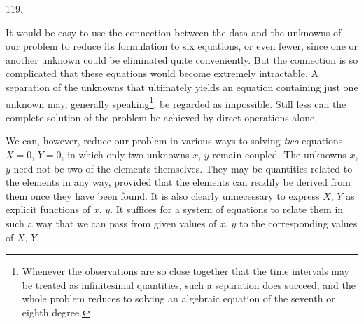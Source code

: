 \par\medskip
\begin{center}\hypertarget{native-166-article119}{}119.\end{center}
It would be easy to use the connection between the data and the unknowns of our problem to reduce its formulation to six equations, or even fewer, since one or another unknown could be eliminated quite conveniently. But the connection is so complicated that these equations would become extremely intractable. A separation of the unknowns that ultimately yields an equation containing just one unknown may, generally speaking\footnote{Whenever the observations are so close together that the time intervals may be treated as infinitesimal quantities, such a separation does succeed, and the whole problem reduces to solving an algebraic equation of the seventh or eighth degree.}, be regarded as impossible. Still less can the complete solution of the problem be achieved by direct operations alone.

We can, however, reduce our problem in various ways to solving \emph{two} equations $X=0$, $Y=0$, in which only two unknowns $x$, $y$ remain coupled. The unknowns $x$, $y$ need not be two of the elements themselves. They may be quantities related to the elements in any way, provided that the elements can readily be derived from them once they have been found. It is also clearly unnecessary to express $X$, $Y$ as explicit functions of $x$, $y$. It suffices for a system of equations to relate them in such a way that we can pass from given values of $x$, $y$ to the corresponding values of $X$, $Y$.
